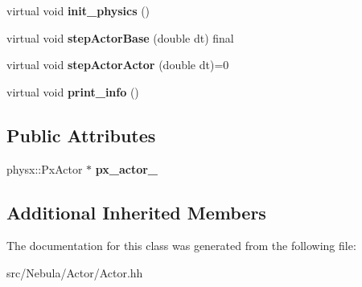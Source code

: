 \begin{DoxyCompactItemize}
\item 
\hypertarget{classNeb_1_1Actor_1_1Actor_1_1Base_a7c88551377b004c027c92a752436d88e}{virtual void {\bfseries init\-\_\-physics} ()}\label{classNeb_1_1Actor_1_1Actor_1_1Base_a7c88551377b004c027c92a752436d88e}

\item 
\hypertarget{classNeb_1_1Actor_1_1Actor_1_1Base_a89cb36f3ea24674935f2de059f5b4aa1}{virtual void {\bfseries step\-Actor\-Base} (double dt) final}\label{classNeb_1_1Actor_1_1Actor_1_1Base_a89cb36f3ea24674935f2de059f5b4aa1}

\item 
\hypertarget{classNeb_1_1Actor_1_1Actor_1_1Base_ab811ca18038b82ecd62dbc2428b63c1e}{virtual void {\bfseries step\-Actor\-Actor} (double dt)=0}\label{classNeb_1_1Actor_1_1Actor_1_1Base_ab811ca18038b82ecd62dbc2428b63c1e}

\item 
\hypertarget{classNeb_1_1Actor_1_1Actor_1_1Base_a142a53c2c361aaee90628eef737b195f}{virtual void {\bfseries print\-\_\-info} ()}\label{classNeb_1_1Actor_1_1Actor_1_1Base_a142a53c2c361aaee90628eef737b195f}

\end{DoxyCompactItemize}
\subsection*{Public Attributes}
\begin{DoxyCompactItemize}
\item 
\hypertarget{classNeb_1_1Actor_1_1Actor_1_1Base_adee942b9aabe682e47e9fbd6dd924e89}{physx\-::\-Px\-Actor $\ast$ {\bfseries px\-\_\-actor\-\_\-}}\label{classNeb_1_1Actor_1_1Actor_1_1Base_adee942b9aabe682e47e9fbd6dd924e89}

\end{DoxyCompactItemize}
\subsection*{Additional Inherited Members}


The documentation for this class was generated from the following file\-:\begin{DoxyCompactItemize}
\item 
src/\-Nebula/\-Actor/Actor.\-hh\end{DoxyCompactItemize}
